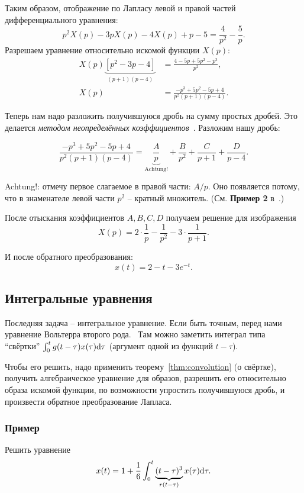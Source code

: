 \documentclass[12pt]{report}
\begin{document}
Таким образом, отображение по Лапласу левой и правой частей дифференциального уравнения:
\[
p^2 X(p) - 3pX(p) -4X(p) + p - 5 = \frac{4}{p^2} - \frac{5}{p}.
\]
Разрешаем уравнение относительно искомой функции $X(p)$:
\begin{align*}
	X(p)\underbrace{\left[p^2 - 3p - 4\right]}_{(p+1)(p-4)} &= \frac{4 - 5p + 5p^2 - p^3}{p^2}, \\
	X(p) &= \frac{-p^3 + 5p^2 - 5p + 4}{p^2(p+1)(p-4)}.
\end{align*}

Теперь нам надо разложить получившуюся дробь на сумму простых дробей. Это делается \emph{методом неопределённых коэффициентов}~\cite{indefinite-coef-method}. Разложим нашу дробь:

\begin{equation*}
\frac{-p^3 + 5p^2 - 5p + 4}{p^2(p+1)(p-4)} = \underbrace{\frac{A}{p}}_{\text{Achtung!}} + \frac{B}{p^2} + \frac{C}{p+1} + \frac{D}{p-4}.
\end{equation*}

Achtung!: отмечу первое слагаемое в правой части: $A/p$. Оно появляется потому, что в знаменателе левой части $p^2$ -- кратный множитель. (См. \textbf{Пример 2} в~\cite{indefinite-coef-method}.)

После отыскания коэффициентов $A,B,C,D$ получаем решение для изображения
\[
X(p) = 2\cdot\frac1p - \frac{1}{p^2} - 3\cdot\frac{1}{p+1}.
\]

И после обратного преобразования:
\[
x(t) = 2 - t - 3e^{-t}.
\]

\subsection{Интегральные уравнения}
Последняя задача -- интегральное уравнение. Если быть точным, перед нами уравнение Вольтерра второго рода.~\cite[см.~ф-лу~8.11]{integral-equations} Там можно заметить интеграл типа ``свёртки'' $\int_0^t g(t-\tau)x(\tau)\mathrm d\tau$ (аргумент одной из функций $t-\tau$).

Чтобы его решить, надо применить теорему~\ref{thm:convolution} (о свёртке), получить алгебраическое уравнение для образов, разрешить его относительно образа искомой функции, по возможности упростить получившуюся дробь, и произвести обратное преобразование Лапласа.

\subsubsection{Пример}
Решить уравнение
\begin{equation}\label{eq:integr-1}
x(t) = 1 + \frac16\int_0^t \underbrace{(t-\tau)^3}_{r(t-\tau)} x(\tau)\mathrm d\tau. 
\end{equation}
\end{document}
